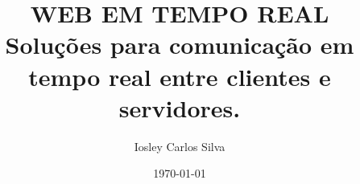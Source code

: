 \documentclass[
	article,
    a4paper,
    12pt,
    oneside,
    english,			%
    brazil,
    sumario=tradicional
]{abntex2}
\title{WEB EM TEMPO REAL \\Soluções para comunicação em tempo real entre clientes e servidores.}
\author{Iosley Carlos Silva}
\date{\today}
\begin{document}
	
\maketitle














{ \clearpage
	
}


{ \clearpage
	\listoffigures
}
\end{document}
